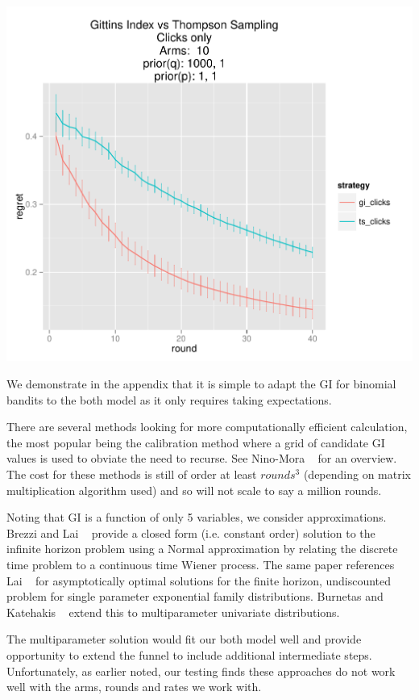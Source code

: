 \documentclass[11pt,a4,singlespacing,titlepagenumber=on]{scrreprt}
\numberwithin{equation}{chapter} %
\theoremstyle{remark}
\begin{document}
\includegraphics[scale=0.7]{GIvsTS.pdf}

We demonstrate in the appendix that it is simple to adapt the GI for binomial bandits to the both model as it only requires taking expectations.

There are several methods looking for more computationally efficient calculation, the most popular being the calibration method where a grid of candidate GI values is used to obviate the need to recurse. See Nino-Mora ~\cite{nino2011computing} for an overview. The cost for these methods is still of order at least $rounds^3$ (depending on matrix multiplication algorithm used) and so will not scale to say a million rounds.

Noting that GI is a function of only 5 variables, we consider approximations. Brezzi and Lai ~\cite{brezzi2002optimal} provide a closed form (i.e. constant order) solution to the infinite horizon problem using a Normal approximation by relating the discrete time problem to a continuous time Wiener process.  The same paper references Lai ~\cite{lai1987adaptive} for asymptotically optimal solutions for the finite horizon, undiscounted problem for single parameter exponential family distributions. Burnetas and Katehakis ~\cite{burnetas1996optimal} extend this to multiparameter univariate distributions.

The multiparameter solution would fit our both model well and provide opportunity to extend the funnel to include additional intermediate steps. Unfortunately, as earlier noted, our testing finds these approaches do not work well with the arms, rounds and rates we work with.
\end{document}
